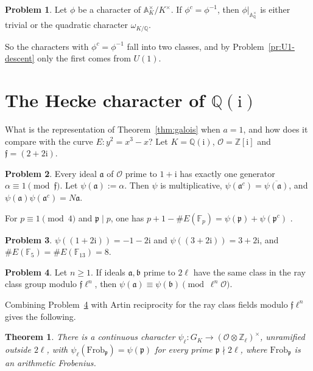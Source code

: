 \documentclass[reqno]{amsart}
\theoremstyle{definition}
\newtheorem{problem}{Problem}[section]
\theoremstyle{plain}
\newtheorem{theorem}{Theorem}[section]
\newcommand{\Z}{\mathbb{Z}}
\newcommand{\Q}{\mathbb{Q}}
\newcommand{\F}{\mathbb{F}}
\newcommand{\A}{\mathbb{A}}
\newcommand{\Oc}{\mathcal{O}}
\newcommand{\Frob}{\mathrm{Frob}}
\newcommand{\ii}{\mathrm{i}}
\begin{document}
\begin{problem}\label{pr:U1-sign}
Let \(\phi\) be a character of \(\A_K^\times/K^\times\).  If \(\phi^c = \phi^{-1}\), then \(\phi|_{\A_\Q^\times}\) is either trivial or the quadratic character \(\omega_{K/\Q}\).
\end{problem}

So the characters with \(\phi^c = \phi^{-1}\) fall into two classes, and by Problem~\ref{pr:U1-descent} only the first comes from \(U(1)\).

\section{The Hecke character of \texorpdfstring{\(\Q(\ii)\)}{Q(i)}}\label{sec:cm}

What is the representation of Theorem~\ref{thm:galois} when \(a = 1\), and how does it compare with the curve \(E \colon y^2 = x^3 - x\)?  Let \(K = \Q(\ii)\), \(\Oc = \Z[\ii]\) and \(\mathfrak{f} = (2 + 2\ii)\).

\begin{problem}\label{pr:primary}
Every ideal \(\mathfrak{a}\) of \(\Oc\) prime to \(1 + \ii\) has exactly one generator \(\alpha \equiv 1 \pmod{\mathfrak{f}}\).  Let \(\psi(\mathfrak{a}) := \alpha\).  Then \(\psi\) is multiplicative, \(\psi(\mathfrak{a}^c) = \overline{\psi(\mathfrak{a})}\), and \(\psi(\mathfrak{a})\psi(\mathfrak{a}^c) = N\mathfrak{a}\).
\end{problem}

For \(p \equiv 1 \pmod 4\) and \(\mathfrak{p} \mid p\), one has \(p + 1 - \#E(\F_p) = \psi(\mathfrak{p}) + \psi(\mathfrak{p}^c)\) \cite[Ch.~18, \S4]{IR}.

\begin{problem}\label{pr:psi-values}
\(\psi((1 + 2\ii)) = -1 - 2\ii\) and \(\psi((3 + 2\ii)) = 3 + 2\ii\), and \(\#E(\F_5) = \#E(\F_{13}) = 8\).
\end{problem}

\begin{problem}\label{pr:ray}
Let \(n \ge 1\).  If ideals \(\mathfrak{a}, \mathfrak{b}\) prime to \(2\ell\) have the same class in the ray class group modulo \(\mathfrak{f}\ell^n\), then \(\psi(\mathfrak{a}) \equiv \psi(\mathfrak{b}) \pmod{\ell^n\Oc}\).
\end{problem}

Combining Problem~\ref{pr:ray} with Artin reciprocity for the ray class fields modulo \(\mathfrak{f}\ell^n\) gives the following.

\begin{theorem}\label{thm:psi-l}
There is a continuous character \(\psi_\ell \colon G_K \to (\Oc \otimes \Z_\ell)^\times\), unramified outside \(2\ell\), with \(\psi_\ell(\Frob_\mathfrak{p}) = \psi(\mathfrak{p})\) for every prime \(\mathfrak{p} \nmid 2\ell\), where \(\Frob_\mathfrak{p}\) is an arithmetic Frobenius.
\end{theorem}
\end{document}
